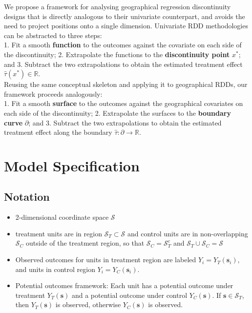 \documentclass[letter]{article}
\providecommand{\tightlist}{%
      \setlength{\itemsep}{0pt}\setlength{\parskip}{0pt}}
\newcommand{\scrS}{\mathscr{S}}
\newcommand{\svec}{\mathbold{s}}
\newcommand{\boundary}{\partial}
\providecommand{\tightlist}{%
  	  \setlength{\itemsep}{0pt}\setlength{\parskip}{0pt}}
\begin{document}
    	We propose a framework for analysing geographical regression discontinuity designs that is directly analogous to their univariate counterpart, and avoids the need to project positions onto a single dimension.
Univariate RDD methodologies can be abstracted to three steps:\\
1. Fit a smooth \textbf{function} to the outcomes against the covariate on each side of the discontinuity;
2. Extrapolate the functions to the \textbf{discontinuity point} \(x^*\); and
3. Subtract the two extrapolations to obtain the estimated treatment effect \(\hat\tau(x^*) \in \mathbb{R}\).\\
Reusing the same conceptual skeleton and applying it to geographical RDDs, our framework proceeds analogously:\\
1. Fit a smooth \textbf{surface} to the outcomes against the geographical covariates on each side of the discontinuity;
2. Extrapolate the surfaces to the \textbf{boundary curve} \(\boundary\); and
3. Subtract the two extrapolations to obtain the estimated treatment effect along the boundary \(\hat\tau: \boundary \rightarrow \mathbb{R}\).
    


    	\section{Model Specification}\label{model-specification}

\subsection{Notation}\label{notation}

\begin{itemize}
\tightlist
\item
  2-dimensional coordinate space \(\scrS\)
\item
  treatment units are in region \(\scrS_T \subset \scrS\) and control units are in non-overlapping \(\scrS_C\) outside of the treatment region, so that \(\scrS_C = \scrS_T^c\) and \(\scrS_T \cup \scrS_C = \scrS\)
\item
  Observed outcomes for units in treatment region are labeled \(Y_i = Y_T(\svec_i)\), and units in control region \(Y_i = Y_C(\svec_i)\).
\item
  Potential outcomes framework: Each unit has a potential outcome under treatment \(Y_T(\svec)\) and a potential outcome under control \(Y_C(\svec)\). If \(\svec \in \scrS_T\), then \(Y_T(\svec)\) is observed, otherwise \(Y_C(\svec)\) is observed.
\end{itemize}
\end{document}
